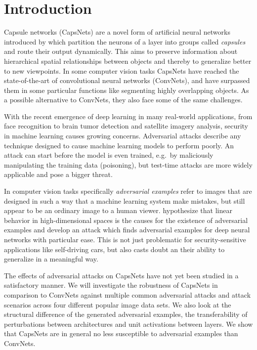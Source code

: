 \section{Introduction}
\label{sec:introduction}

Capsule networks (CapsNets) are a novel form of artificial neural networks introduced by \citet{capsules,em} which partition the neurons of a layer into groups called \emph{capsules} and route their output dynamically.
This aims to preserve information about hierarchical spatial relationships between objects and thereby to generalize better to new viewpoints.
In some computer vision tasks CapsNets have reached the state-of-the-art of convolutional neural networks (ConvNets), and have surpassed them in some particular functions like segmenting highly overlapping objects.
As a possible alternative to ConvNets, they also face some of the same challenges.

With the recent emergence of deep learning in many real-world applications, from face recognition to brain tumor detection and satellite imagery analysis, security in machine learning causes growing concerns.
Adversarial attacks describe any technique designed to cause machine learning models to perform poorly.
An attack can start before the model is even trained, e.g.\ by maliciously manipulating the training data (poisoning), but test-time attacks are more widely applicable and pose a bigger threat.

In computer vision tasks specifically \emph{adversarial examples} \citep{intriguing} refer to images  that are designed in such a way that a machine learning system make mistakes, but still appear to be an ordinary image to a human viewer.
\citet{fgsm} hypothesize that linear behavior in high-dimensional spaces is the causes for the existence of adversarial examples and develop an attack which finds adversarial examples for deep neural networks with particular ease.
This is not just problematic for security-sensitive applications like self-driving cars, but also casts doubt an their ability to generalize in a meaningful way.

The effects of adversarial attacks on CapsNets have not yet been studied in a satisfactory manner.
We will investigate the robustness of CapsNets in comparison to ConvNets against multiple common adversarial attacks and attack scenarios across four different popular image data sets.
We also look at the structural difference of the generated adversarial examples, the transferability of perturbations between architectures and unit activations between layers.
We show that CapsNets are in general no less susceptible to adversarial examples than ConvNets.

